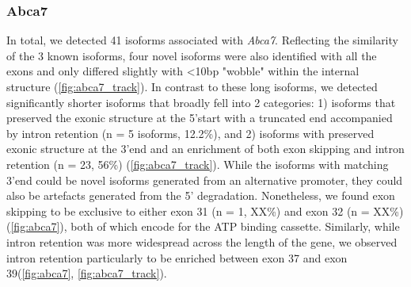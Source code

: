 
\subsubsection{Abca7}
In total, we detected 41 isoforms associated with \textit{Abca7}. Reflecting the similarity of the 3 known isoforms, four novel isoforms were also identified with all the exons and only differed slightly with <10bp "wobble" within the internal structure (\cref{fig:abca7_track}). In contrast to these long isoforms, we detected significantly shorter isoforms that broadly fell into 2 categories: 1) isoforms that preserved the exonic structure at the 5'start with a truncated end accompanied by intron retention (n = 5 isoforms, 12.2\%), and 2) isoforms with preserved exonic structure at the 3'end and an enrichment of both exon skipping and intron retention (n = 23, 56\%) (\cref{fig:abca7_track}). While the isoforms with matching 3'end could be novel isoforms generated from an alternative promoter, they could also be artefacts generated from the 5' degradation. Nonetheless, we found exon skipping to be exclusive to either exon 31 (n = 1, XX\%) and exon 32 (n = XX\%) (\cref{fig:abca7}), both of which encode for the ATP binding cassette. Similarly, while intron retention was more widespread across the length of the gene, we observed intron retention particularly to be enriched between exon 37 and exon 39(\cref{fig:abca7}, \cref{fig:abca7_track}). 

